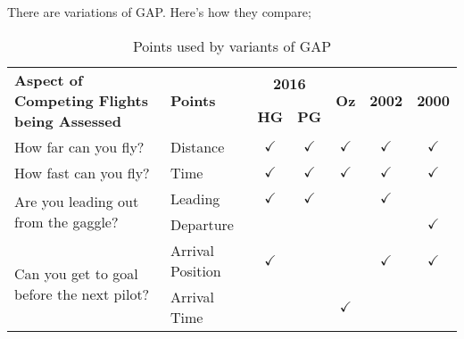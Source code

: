 \documentclass[gap.tex]{subfiles}
\begin{document}
There are variations of GAP. Here's how they compare;
\begin{table}[!ht]
    \begin{tabularx}{\textwidth}{|X|l|c|c|c|c|c|}
    \hline
         \multirow{2}{*}{\textbf{Aspect of Competing Flights being Assessed}}
         & \multirow{2}{*}{\textbf{Points}}
         & \multicolumn{2}{c|}{\textbf{2016}}
         & \multirow{2}{*}{\textbf{Oz}}
         & \multirow{2}{*}{\textbf{2002}}
         & \multirow{2}{*}{\textbf{2000}}
         \\
    \cline{3-4}
         &
         & \textbf{HG}
         & \textbf{PG}
         &
         &
         &
         \\
    \hline
        How far can you fly?
        & Distance
        & $\checkmark$
        & $\checkmark$
        & $\checkmark$
        & $\checkmark$
        & $\checkmark$
        \\
    \hline
        How fast can you fly?
        & Time
        & $\checkmark$
        & $\checkmark$
        & $\checkmark$
        & $\checkmark$
        & $\checkmark$
        \\
    \hline
        \multirow{2}{*}{Are you leading out from the gaggle?}
        & Leading
        & $\checkmark$
        & $\checkmark$
        &
        & $\checkmark$
        &
        \\
    \cline{2-7}
        & Departure
        &
        &
        &
        &
        & $\checkmark$
        \\
    \hline
        \multirow{2}{*}{Can you get to goal before the next pilot?}
        & Arrival Position
        & $\checkmark$
        &
        &
        & $\checkmark$
        & $\checkmark$
        \\
    \cline{2-7}
        & Arrival Time
        &
        &
        & $\checkmark$
        &
        &
        \\
    \hline
    \end{tabularx}
    \caption{Points used by variants of GAP}
    \label{tab:gap-variants}
\end{table}
\end{document}
